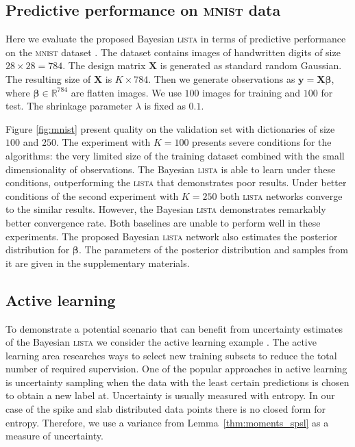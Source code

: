 \documentclass{article}
\begin{document}
\subsection{Predictive performance on \textsc{mnist} data}
Here we evaluate the proposed Bayesian \textsc{lista} in terms of predictive performance on the \textsc{mnist} dataset \citep{lecun1998gradient}. The dataset contains images of handwritten digits of size $28 \times 28 = 784$. The design matrix $\mathbf{X}$ is generated as standard random Gaussian. The resulting size of $\mathbf{X}$ is $K \times 784$. Then we generate observations as $\mathbf{y} = \mathbf{X}\boldsymbol\beta$, where $\boldsymbol\beta \in \mathbb{R}^{784}$ are flatten images. We use $100$ images for training and $100$ for test. The shrinkage parameter $\lambda$ is fixed as $0.1$.

Figure \ref{fig:mnist} present quality on the validation set with dictionaries of size $100$ and $250$.  The experiment with $K=100$ presents severe conditions for the algorithms: the very limited size of the training dataset combined with the small dimensionality of observations. The Bayesian \textsc{lista} is able to learn under these conditions, outperforming the \textsc{lista} that demonstrates poor results. Under better conditions of the second experiment with $K=250$ both \textsc{lista} networks converge to the similar results. However, the Bayesian \textsc{lista} demonstrates remarkably better convergence rate. Both baselines are unable to perform well in these experiments. The proposed Bayesian \textsc{lista} network also estimates the posterior distribution for $\boldsymbol\beta$. The parameters of the posterior distribution and samples from it are given in the supplementary materials.

\subsection{Active learning}
To demonstrate a potential scenario that can benefit from uncertainty estimates of the Bayesian \textsc{lista} we consider the active learning example \citep{settles.tr09}. The active learning area researches ways to select new training subsets to reduce the total number of required supervision. One of the popular approaches in active learning is uncertainty sampling when the data with the least certain predictions is chosen to obtain a new label at. Uncertainty is usually measured with entropy. In our case of the spike and slab distributed data points there is no closed form for entropy. Therefore, we use a variance from Lemma~\ref{thm:moments_spsl} as a measure of uncertainty.
\end{document}
